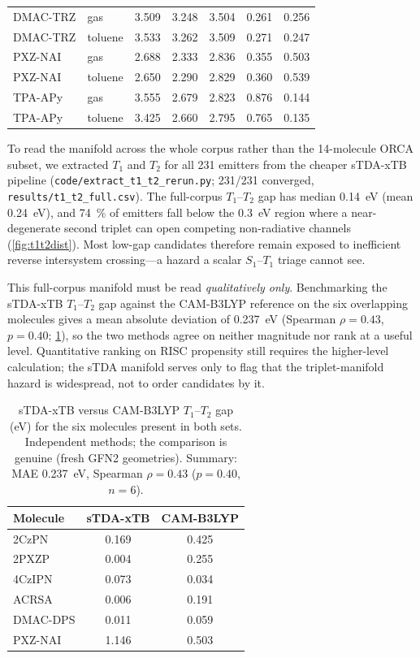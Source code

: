 \documentclass[twoside,twocolumn,9pt]{extarticle}
\begin{document}
\begin{table}[htbp]
\begin{tabular}{llccccc}
    DMAC-TRZ & gas & 3.509 & 3.248 & 3.504 & 0.261 & 0.256 \\
    DMAC-TRZ & toluene & 3.533 & 3.262 & 3.509 & 0.271 & 0.247 \\
    PXZ-NAI & gas & 2.688 & 2.333 & 2.836 & 0.355 & 0.503 \\
    PXZ-NAI & toluene & 2.650 & 2.290 & 2.829 & 0.360 & 0.539 \\
    TPA-APy & gas & 3.555 & 2.679 & 2.823 & 0.876 & 0.144 \\
    TPA-APy & toluene & 3.425 & 2.660 & 2.795 & 0.765 & 0.135 \\
    \bottomrule
  \end{tabular}
\end{table}

To read the manifold across the whole corpus rather than the \num{14}-molecule ORCA
subset, we extracted $T_1$ and $T_2$ for all \num{231} emitters from the cheaper
sTDA-xTB pipeline (\texttt{code/extract\_t1\_t2\_rerun.py}; \num{231}/\num{231}
converged, \texttt{results/t1\_t2\_full.csv}). The full-corpus $T_1$--$T_2$ gap has median
\qty{0.14}{\electronvolt} (mean \qty{0.24}{\electronvolt}), and \qty{74}{\percent} of
emitters fall below the \qty{0.3}{\electronvolt} region where a near-degenerate second
triplet can open competing non-radiative channels (\cref{fig:t1t2dist}). Most
low-gap candidates therefore remain exposed to inefficient reverse intersystem
crossing---a hazard a scalar $S_1$--$T_1$ triage cannot see.

This full-corpus manifold must be read \emph{qualitatively only}. Benchmarking the
sTDA-xTB $T_1$--$T_2$ gap against the CAM-B3LYP reference on the six overlapping
molecules gives a mean absolute deviation of \qty{0.237}{\electronvolt}
(Spearman $\rho = 0.43$, $p = 0.40$; \cref{tab:manifold_val}), so the two methods agree
on neither magnitude nor rank at a useful level. Quantitative ranking on RISC propensity
still requires the higher-level calculation; the sTDA manifold serves only to flag that
the triplet-manifold hazard is widespread, not to order candidates by it.

\begin{table}[htbp]
  \centering
  \caption{sTDA-xTB versus CAM-B3LYP $T_1$--$T_2$ gap (eV) for the six molecules present
    in both sets. Independent methods; the comparison is genuine (fresh GFN2 geometries).
    Summary: MAE \qty{0.237}{\electronvolt}, Spearman $\rho = 0.43$ ($p = 0.40$, $n = 6$).}
  \label{tab:manifold_val}
  \small
  \begin{tabular}{lcc}
    \toprule
    Molecule & sTDA-xTB & CAM-B3LYP \\
    \midrule
    2CzPN    & 0.169 & 0.425 \\
    2PXZP    & 0.004 & 0.255 \\
    4CzIPN   & 0.073 & 0.034 \\
    ACRSA    & 0.006 & 0.191 \\
    DMAC-DPS & 0.011 & 0.059 \\
    PXZ-NAI  & 1.146 & 0.503 \\
    \bottomrule
  \end{tabular}
\end{table}
\end{document}
